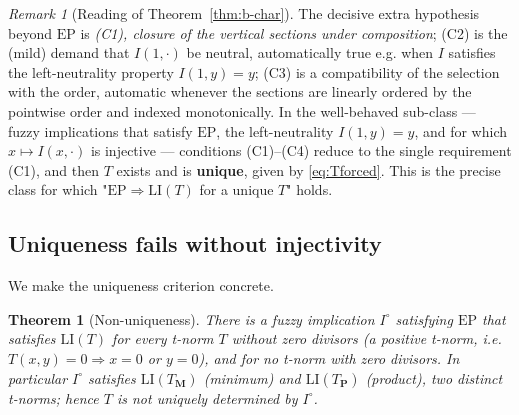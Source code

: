 \documentclass{amsart}
\newtheorem{theorem}{Theorem}
\theoremstyle{definition}
\theoremstyle{remark}
\newtheorem{remark}{Remark}
\newcommand{\LI}{\mathrm{LI}}
\newcommand{\EP}{\mathrm{EP}}
\begin{document}
\begin{remark}[Reading of Theorem~\ref{thm:b-char}]
The decisive extra hypothesis beyond $\EP$ is \emph{(C1), closure of the vertical sections
under composition}; (C2) is the (mild) demand that $I(1,\cdot)$ be neutral, automatically
true e.g. when $I$ satisfies the left-neutrality property $I(1,y)=y$; (C3) is a compatibility
of the selection with the order, automatic whenever the sections are linearly ordered by the
pointwise order and indexed monotonically. In the well-behaved sub-class --- fuzzy
implications that satisfy $\EP$, the left-neutrality $I(1,y)=y$, and for which
$x\mapsto I(x,\cdot)$ is injective --- conditions (C1)--(C4) reduce to the single requirement
(C1), and then $T$ exists and is \textbf{unique}, given by \eqref{eq:Tforced}. This is the
precise class for which "$\EP\Rightarrow\LI(T)$ for a unique $T$" holds.
\end{remark}

\subsection{Uniqueness fails without injectivity}

We make the uniqueness criterion concrete.

\begin{theorem}[Non-uniqueness]\label{thm:nonunique}
There is a fuzzy implication $I^{\circ}$ satisfying $\EP$ that satisfies $\LI(T)$ for
\emph{every} t-norm $T$ without zero divisors (a \emph{positive} t-norm, i.e.
$T(x,y)=0\Rightarrow x=0$ or $y=0$), and for no t-norm with zero divisors. In particular
$I^{\circ}$ satisfies $\LI(T_{\mathbf M})$ (minimum) and $\LI(T_{\mathbf P})$ (product),
two distinct t-norms; hence $T$ is not uniquely determined by $I^{\circ}$.
\end{theorem}
\end{document}
